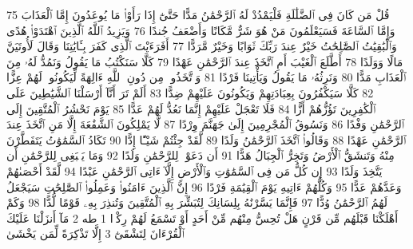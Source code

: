 {\tiny\colorbox{cl_aya}{75}} قُلْ مَن كَانَ فِى ٱلضَّلَٰلَةِ فَلْيَمْدُدْ لَهُ ٱلرَّحْمَٰنُ مَدًّا حَتَّىٰٓ إِذَا رَأَوْا۟ مَا يُوعَدُونَ إِمَّا ٱلْعَذَابَ وَإِمَّا ٱلسَّاعَةَ فَسَيَعْلَمُونَ مَنْ هُوَ شَرٌّ مَّكَانًا وَأَضْعَفُ جُندًا
{\tiny\colorbox{cl_aya}{76}} وَيَزِيدُ ٱللَّهُ ٱلَّذِينَ ٱهْتَدَوْا۟ هُدًى وَٱلْبَٰقِيَٰتُ ٱلصَّٰلِحَٰتُ خَيْرٌ عِندَ رَبِّكَ ثَوَابًا وَخَيْرٌ مَّرَدًّا
{\tiny\colorbox{cl_aya}{77}} أَفَرَءَيْتَ ٱلَّذِى كَفَرَ بِـَٔايَٰتِنَا وَقَالَ لَأُوتَيَنَّ مَالًا وَوَلَدًا
{\tiny\colorbox{cl_aya}{78}} أَطَّلَعَ ٱلْغَيْبَ أَمِ ٱتَّخَذَ عِندَ ٱلرَّحْمَٰنِ عَهْدًا
{\tiny\colorbox{cl_aya}{79}} كَلَّا سَنَكْتُبُ مَا يَقُولُ وَنَمُدُّ لَهُۥ مِنَ ٱلْعَذَابِ مَدًّا
{\tiny\colorbox{cl_aya}{80}} وَنَرِثُهُۥ مَا يَقُولُ وَيَأْتِينَا فَرْدًا
{\tiny\colorbox{cl_aya}{81}} وَٱتَّخَذُوا۟ مِن دُونِ ٱللَّهِ ءَالِهَةً لِّيَكُونُوا۟ لَهُمْ عِزًّا
{\tiny\colorbox{cl_aya}{82}} كَلَّا سَيَكْفُرُونَ بِعِبَادَتِهِمْ وَيَكُونُونَ عَلَيْهِمْ ضِدًّا
{\tiny\colorbox{cl_aya}{83}} أَلَمْ تَرَ أَنَّآ أَرْسَلْنَا ٱلشَّيَٰطِينَ عَلَى ٱلْكَٰفِرِينَ تَؤُزُّهُمْ أَزًّا
{\tiny\colorbox{cl_aya}{84}} فَلَا تَعْجَلْ عَلَيْهِمْ إِنَّمَا نَعُدُّ لَهُمْ عَدًّا
{\tiny\colorbox{cl_aya}{85}} يَوْمَ نَحْشُرُ ٱلْمُتَّقِينَ إِلَى ٱلرَّحْمَٰنِ وَفْدًا
{\tiny\colorbox{cl_aya}{86}} وَنَسُوقُ ٱلْمُجْرِمِينَ إِلَىٰ جَهَنَّمَ وِرْدًا
{\tiny\colorbox{cl_aya}{87}} لَّا يَمْلِكُونَ ٱلشَّفَٰعَةَ إِلَّا مَنِ ٱتَّخَذَ عِندَ ٱلرَّحْمَٰنِ عَهْدًا
{\tiny\colorbox{cl_aya}{88}} وَقَالُوا۟ ٱتَّخَذَ ٱلرَّحْمَٰنُ وَلَدًا
{\tiny\colorbox{cl_aya}{89}} لَّقَدْ جِئْتُمْ شَيْـًٔا إِدًّا
{\tiny\colorbox{cl_aya}{90}} تَكَادُ ٱلسَّمَٰوَٰتُ يَتَفَطَّرْنَ مِنْهُ وَتَنشَقُّ ٱلْأَرْضُ وَتَخِرُّ ٱلْجِبَالُ هَدًّا
{\tiny\colorbox{cl_aya}{91}} أَن دَعَوْا۟ لِلرَّحْمَٰنِ وَلَدًا
{\tiny\colorbox{cl_aya}{92}} وَمَا يَنۢبَغِى لِلرَّحْمَٰنِ أَن يَتَّخِذَ وَلَدًا
{\tiny\colorbox{cl_aya}{93}} إِن كُلُّ مَن فِى ٱلسَّمَٰوَٰتِ وَٱلْأَرْضِ إِلَّآ ءَاتِى ٱلرَّحْمَٰنِ عَبْدًا
{\tiny\colorbox{cl_aya}{94}} لَّقَدْ أَحْصَىٰهُمْ وَعَدَّهُمْ عَدًّا
{\tiny\colorbox{cl_aya}{95}} وَكُلُّهُمْ ءَاتِيهِ يَوْمَ ٱلْقِيَٰمَةِ فَرْدًا
{\tiny\colorbox{cl_aya}{96}} إِنَّ ٱلَّذِينَ ءَامَنُوا۟ وَعَمِلُوا۟ ٱلصَّٰلِحَٰتِ سَيَجْعَلُ لَهُمُ ٱلرَّحْمَٰنُ وُدًّا
{\tiny\colorbox{cl_aya}{97}} فَإِنَّمَا يَسَّرْنَٰهُ بِلِسَانِكَ لِتُبَشِّرَ بِهِ ٱلْمُتَّقِينَ وَتُنذِرَ بِهِۦ قَوْمًا لُّدًّا
{\tiny\colorbox{cl_aya}{98}} وَكَمْ أَهْلَكْنَا قَبْلَهُم مِّن قَرْنٍ هَلْ تُحِسُّ مِنْهُم مِّنْ أَحَدٍ أَوْ تَسْمَعُ لَهُمْ رِكْزًۢا
{\tiny\colorbox{cl_aya}{1}} طه
{\tiny\colorbox{cl_aya}{2}} مَآ أَنزَلْنَا عَلَيْكَ ٱلْقُرْءَانَ لِتَشْقَىٰٓ
{\tiny\colorbox{cl_aya}{3}} إِلَّا تَذْكِرَةً لِّمَن يَخْشَىٰ
